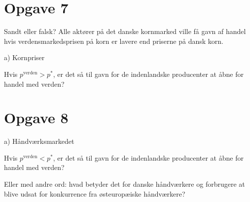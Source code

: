\section{Opgave 7}

\begin{frame}

Sandt eller falsk? Alle aktører på det danske kornmarked ville få gavn af handel hvis verdensmarkedsprisen på korn er lavere end priserne på dansk korn.

\end{frame}

\begin{frame}{a) Kornpriser}

Hvis $p^{\textrm{verden}}>p^*$, er det så til gavn for de indenlandske producenter at åbne for handel med verden?


\end{frame}

\section{Opgave 8}

\begin{frame}{a) Håndværksmarkedet}

Hvis $p^{\textrm{verden}}<p^*$, er det så til gavn for de indenlandske producenter at åbne for handel med verden?

Eller med andre ord: hvad betyder det for danske håndværkere og forbrugere at blive udsat for konkurrence fra østeuropæiske håndværkere?

\end{frame}
